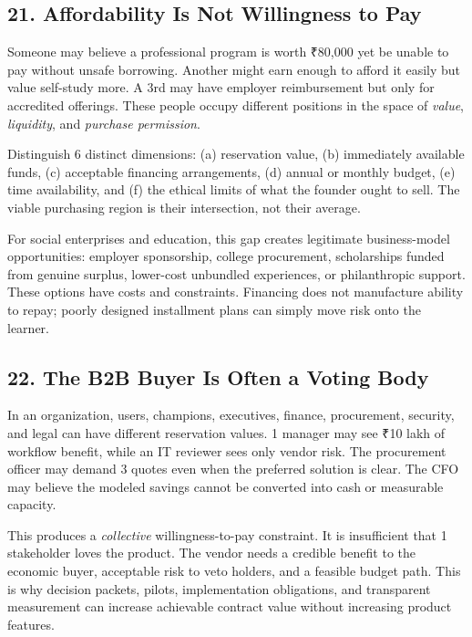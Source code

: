 \subsection*{21. Affordability Is Not Willingness to Pay}

Someone may believe a professional program is worth ₹80,000 yet be unable to pay without unsafe borrowing. Another might earn enough to afford it easily but value self-study more. A 3rd may have employer reimbursement but only for accredited offerings. These people occupy different positions in the space of \emph{value}, \emph{liquidity}, and \emph{purchase permission}.

Distinguish 6 distinct dimensions: (a) reservation value, (b) immediately available funds, (c) acceptable financing arrangements, (d) annual or monthly budget, (e) time availability, and (f) the ethical limits of what the founder ought to sell. The viable purchasing region is their intersection, not their average.

For social enterprises and education, this gap creates legitimate business-model opportunities: employer sponsorship, college procurement, scholarships funded from genuine surplus, lower-cost unbundled experiences, or philanthropic support. These options have costs and constraints. Financing does not manufacture ability to repay; poorly designed installment plans can simply move risk onto the learner.

\subsection*{22. The B2B Buyer Is Often a Voting Body}

In an organization, users, champions, executives, finance, procurement, security, and legal can have different reservation values. 1 manager may see ₹10 lakh of workflow benefit, while an IT reviewer sees only vendor risk. The procurement officer may demand 3 quotes even when the preferred solution is clear. The CFO may believe the modeled savings cannot be converted into cash or measurable capacity.

This produces a \emph{collective} willingness-to-pay constraint. It is insufficient that 1 stakeholder loves the product. The vendor needs a credible benefit to the economic buyer, acceptable risk to veto holders, and a feasible budget path. This is why decision packets, pilots, implementation obligations, and transparent measurement can increase achievable contract value without increasing product features.

